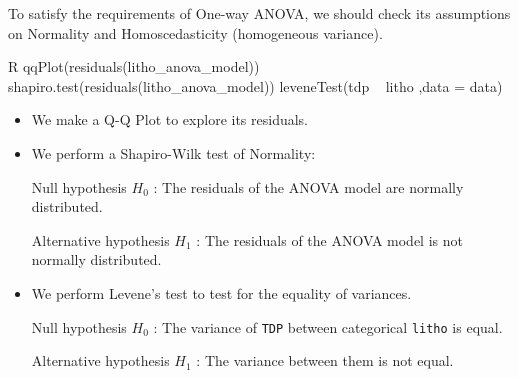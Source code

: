 To satisfy the requirements of One-way ANOVA, we should check its assumptions on Normality and Homoscedasticity (homogeneous variance).

\begin{code}{R}
    qqPlot(residuals(litho_anova_model))
    shapiro.test(residuals(litho_anova_model))
    leveneTest(tdp ~ litho ,data = data)
\end{code}
\begin{itemize}
    \item We make a Q-Q Plot to explore its residuals.

    \item We perform a Shapiro-Wilk test of Normality:
    
        \qquad Null hypothesis $H_0$ : The residuals of the ANOVA model are normally distributed.

        \qquad Alternative hypothesis $H_1$ : The residuals of the ANOVA model is not normally distributed.

    \item We perform Levene's test to test for the equality of variances.
    
        \qquad Null hypothesis $H_0$ : The variance of \verb|TDP| between categorical \verb|litho| is equal.

        \qquad Alternative hypothesis $H_1$ : The variance between them is not equal.
\end{itemize}

